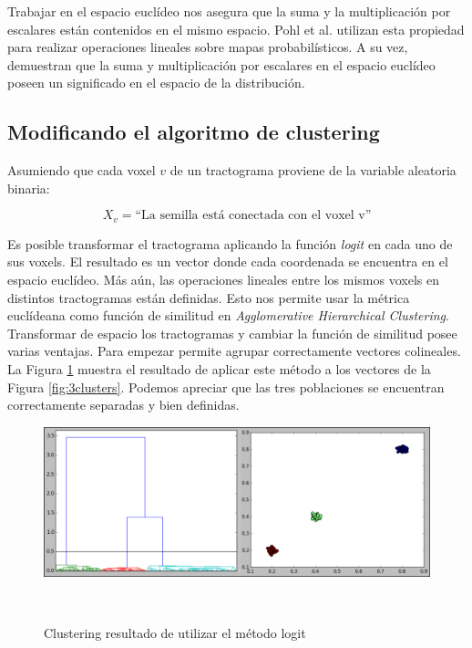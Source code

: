 Trabajar en el espacio eucl\'ideo nos asegura que la suma y la multiplicaci\'on
por escalares est\'an contenidos en el mismo espacio. Pohl et al. \cite{Pohl2007} 
utilizan esta propiedad para realizar operaciones lineales sobre mapas
probabil\'isticos. A su vez, demuestran que la suma y multiplicaci\'on
por escalares en el espacio eucl\'ideo poseen un significado en el espacio de la
distribuci\'on. \\

\subsection{Modificando el algoritmo de clustering}
\label{sec:modificandoClustering}

Asumiendo que cada voxel $v$ de un tractograma proviene de la variable 
aleatoria binaria:

 $$X_v= \textrm{``La semilla est\'a conectada con el voxel v''}$$
 
Es posible transformar el tractograma aplicando la funci\'on \textit{logit} en
cada uno de sus voxels. El resultado es un vector donde cada coordenada se 
encuentra en el espacio eucl\'ideo. M\'as a\'un, las operaciones lineales entre
los mismos voxels en distintos tractogramas est\'an definidas. Esto nos permite
usar la m\'etrica eucl\'ideana como funci\'on de similitud en \textit{Agglomerative
Hierarchical Clustering}. \\

Transformar de espacio los tractogramas y cambiar la funci\'on de similitud 
posee varias ventajas. Para empezar permite agrupar correctamente vectores
colineales. La Figura \ref{fig:3logit} muestra el resultado de aplicar este
m\'etodo a los vectores de la Figura \ref{fig:3clusters}. Podemos apreciar 
que las tres poblaciones se encuentran correctamente separadas y bien definidas.\\

\begin{figure}[h!]

\centering
\begin{minipage}[b]{0.85\textwidth}
    \includegraphics[width=\textwidth]{img/3pop_logit.png}
    \caption{Clustering resultado de utilizar el m\'etodo logit}
    \label{fig:3logit}
\end{minipage} ~

\end{figure}  

